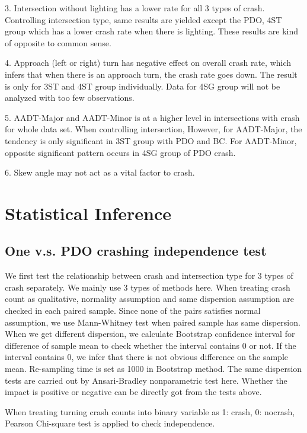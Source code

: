 \documentclass[11pt]{scrartcl} %
\begin{document}
3. Intersection without lighting has a lower rate for all 3 types of crash. Controlling intersection type, same results are yielded except the PDO, 4ST group which has a lower crash rate when there is lighting. These results are kind of opposite to common sense.

4. Approach (left or right) turn has negative effect on overall crash rate, which infers that when there is an approach turn, the crash rate goes down. The result is only for 3ST and 4ST group individually. Data for 4SG group will not be analyzed with too few observations.

5. AADT-Major and AADT-Minor is at a higher level in intersections with crash for whole data set. When controlling intersection, However, for AADT-Major, the tendency is only significant in 3ST group with PDO and BC. For AADT-Minor, opposite significant pattern occurs in 4SG group of PDO crash.

6. Skew angle may not act as a vital factor to crash.

\section{Statistical Inference}

\subsection{One v.s. PDO crashing independence test}

We first test the relationship between crash and intersection type for 3 types of crash separately. We mainly use 3 types of methods here. When treating crash count as qualitative, normality assumption and same dispersion assumption are checked in each paired sample. Since none of the pairs satisfies normal assumption, we use Mann-Whitney test when paired sample has same dispersion. When we get different dispersion, we calculate Bootstrap confidence interval for difference of sample mean to check whether the interval contains 0 or not. If the interval contains 0, we infer that there is not obvious difference on the sample mean. Re-sampling time is set as 1000 in Bootstrap method. The same dispersion tests are carried out by Ansari-Bradley nonparametric test here. Whether the impact is positive or negative can be directly got from the tests above.

When treating turning crash counts into binary variable as 1: crash, 0: nocrash, Pearson Chi-square test is applied to check independence.
\end{document}
